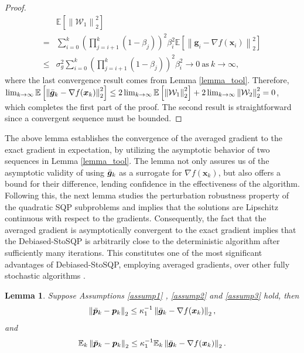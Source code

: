\documentclass[aos]{imsart}
\numberwithin{equation}{section}
\theoremstyle{plain}
\newtheorem{lemma}{Lemma}
\begin{document}
\begin{appendix}
\begin{proof}
\begin{equation*}
\begin{split}
            & \mathbb{E}\left[ \left\|\mathcal{W}_1\right\|_2^2 \right] \\
            = & \sum_{i=0}^{k} \left( \prod_{j=i+1}^{k} (1-\beta_j) \right)^2 \beta_i^2 \mathbb{E}\left[ \left\| \bm{g}_{i} - \nabla f(\bm{x}_{i}) \right\|_2^2 \right] \\
        \leq & \sigma_{g}^2 \sum_{i=0}^{k} \left( \prod_{j=i+1}^{k} (1-\beta_j ) \right)^2 \beta_i^2 \to 0 ~\text{as}~ k \to \infty,
        \end{split}
    \end{equation*}
    where the last convergence result comes from Lemma \ref{lemma_tool}. Therefore,   $\lim_{k \to \infty}\mathbb{E} \left[\left\| \Bar{\bm{g}}_{k} - \nabla f(\bm{x}_k) \right\|_2^2 \right] \leq 2\lim_{k \to \infty}\mathbb{E} \left[ \left\|\mathcal{W}_1\right\|_2^2 \right] + 2 \lim_{k \to \infty} \left\|\mathcal{W}_2\right\|_2^2 = 0$, which completes the first part of the proof. The second result is straightforward since a convergent sequence must be bounded.
\end{proof}


The above lemma establishes the convergence of the averaged gradient to the exact gradient in expectation, by utilizing the asymptotic behavior of two sequences in Lemma \ref{lemma_tool}. The lemma not only assures us of the asymptotic validity of using $\Bar{\bm{g}}_k$ as a surrogate for $\nabla f(\bm{x}_k)$, but also offers a bound for their difference, lending confidence in the effectiveness of the algorithm. Following this, the next lemma studies the perturbation robustness property of the quadratic SQP subproblems and implies that the solutions are Lipschitz continuous with respect to the gradients. Consequently, the fact that the averaged gradient is asymptotically convergent to the exact gradient implies that the Debiased-StoSQP is arbitrarily close to the deterministic algorithm after sufficiently many iterations. This constitutes one of the most significant advantages of Debiased-StoSQP, employing averaged gradients, over other fully stochastic algorithms \cite{berahas2021sequential, curtis2023sequential}.


\begin{lemma}
\label{lemma19}
    Suppose Assumptions \ref{assump1} , \ref{assump2} and \ref{assump3} hold, then  
    \begin{equation}
        \left\| \Bar{\bm{p}}_k - \bm{p}_k \right\|_2 \leq \kappa_1^{-1} \left\| \Bar{\bm{g}}_{k} - \nabla f(\bm{x}_k)  \right\|_2,
    \end{equation}
    and
    \begin{equation*}
        \mathbb{E}_k \left\| \Bar{\bm{p}}_k - \bm{p}_k \right\|_2 \leq \kappa_1^{-1} \mathbb{E}_k \left\|\Bar{\bm{g}}_{k} - \nabla f(\bm{x}_k)  \right\|_2.
    \end{equation*}
\end{lemma}


\end{appendix}
\end{document}
